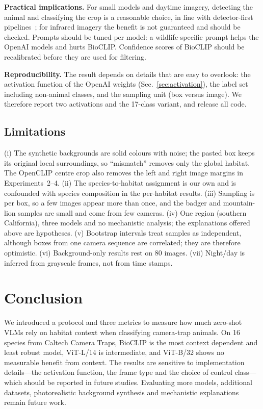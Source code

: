 \documentclass[conference]{IEEEtran}
\begin{document}
\textbf{Practical implications.} For small models and daytime imagery, detecting the animal and classifying the crop is a reasonable choice, in line with detector-first pipelines~\cite{beery2019}; for infrared imagery the benefit is not guaranteed and should be checked. Prompts should be tuned per model: a wildlife-specific prompt helps the OpenAI models and hurts BioCLIP. Confidence scores of BioCLIP should be recalibrated before they are used for filtering.

\textbf{Reproducibility.} The result depends on details that are easy to overlook: the activation function of the OpenAI weights (Sec.~\ref{sec:activation}), the label set including non-animal classes, and the sampling unit (box versus image). We therefore report two activations and the 17-class variant, and release all code.

\subsection{Limitations}\label{sec:limits}
(i) The synthetic backgrounds are solid colours with noise; the pasted box keeps its original local surroundings, so ``mismatch'' removes only the global habitat. The OpenCLIP centre crop also removes the left and right image margins in Experiments~2--4. (ii) The species-to-habitat assignment is our own and is confounded with species composition in the per-habitat results. (iii) Sampling is per box, so a few images appear more than once, and the badger and mountain-lion samples are small and come from few cameras. (iv) One region (southern California), three models and no mechanistic analysis; the explanations offered above are hypotheses. (v) Bootstrap intervals treat samples as independent, although boxes from one camera sequence are correlated; they are therefore optimistic. (vi) Background-only results rest on 80 images. (vii) Night/day is inferred from grayscale frames, not from time stamps.

\section{Conclusion}
We introduced a protocol and three metrics to measure how much zero-shot VLMs rely on habitat context when classifying camera-trap animals. On 16 species from Caltech Camera Traps, BioCLIP is the most context dependent and least robust model, ViT-L/14 is intermediate, and ViT-B/32 shows no measurable benefit from context. The results are sensitive to implementation details---the activation function, the frame type and the choice of control class---which should be reported in future studies. Evaluating more models, additional datasets, photorealistic background synthesis and mechanistic explanations remain future work.
\end{document}
